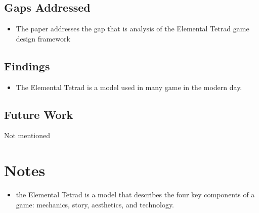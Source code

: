 \subsection{Gaps Addressed}
\begin{itemize}
    \item The paper addresses the gap that is analysis of the Elemental Tetrad game design framework
\end{itemize}

\subsection{Findings}
\begin{itemize}
    \item The Elemental Tetrad is a model used in many game in the modern day.
\end{itemize}


\subsection{Future Work}
Not mentioned    

\section{Notes}
\begin{itemize}
\item the Elemental Tetrad is a model that describes the four key components of a game: mechanics, story, aesthetics, and technology.

\end{itemize}

